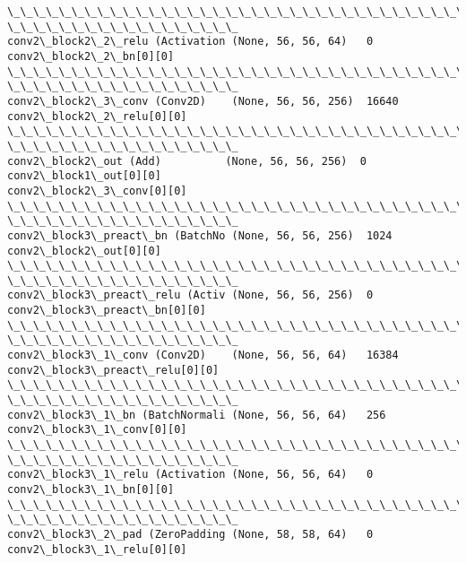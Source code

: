 \documentclass[11pt]{article}
\begin{document}
\begin{Verbatim}[commandchars=\\\{\}]
\_\_\_\_\_\_\_\_\_\_\_\_\_\_\_\_\_\_\_\_\_\_\_\_\_\_\_\_\_\_\_\_\_\_\_\_\_\_\_\_\_\_\_\_\_\_\_\_\_\_\_\_\_\_\_\_\_\_\_\_\_\_\_\_\_\_\_\_\_\_\_\_\_\_\_\_\_\_\_\_
\_\_\_\_\_\_\_\_\_\_\_\_\_\_\_\_\_\_
conv2\_block2\_2\_relu (Activation (None, 56, 56, 64)   0
conv2\_block2\_2\_bn[0][0]
\_\_\_\_\_\_\_\_\_\_\_\_\_\_\_\_\_\_\_\_\_\_\_\_\_\_\_\_\_\_\_\_\_\_\_\_\_\_\_\_\_\_\_\_\_\_\_\_\_\_\_\_\_\_\_\_\_\_\_\_\_\_\_\_\_\_\_\_\_\_\_\_\_\_\_\_\_\_\_\_
\_\_\_\_\_\_\_\_\_\_\_\_\_\_\_\_\_\_
conv2\_block2\_3\_conv (Conv2D)    (None, 56, 56, 256)  16640
conv2\_block2\_2\_relu[0][0]
\_\_\_\_\_\_\_\_\_\_\_\_\_\_\_\_\_\_\_\_\_\_\_\_\_\_\_\_\_\_\_\_\_\_\_\_\_\_\_\_\_\_\_\_\_\_\_\_\_\_\_\_\_\_\_\_\_\_\_\_\_\_\_\_\_\_\_\_\_\_\_\_\_\_\_\_\_\_\_\_
\_\_\_\_\_\_\_\_\_\_\_\_\_\_\_\_\_\_
conv2\_block2\_out (Add)          (None, 56, 56, 256)  0
conv2\_block1\_out[0][0]
conv2\_block2\_3\_conv[0][0]
\_\_\_\_\_\_\_\_\_\_\_\_\_\_\_\_\_\_\_\_\_\_\_\_\_\_\_\_\_\_\_\_\_\_\_\_\_\_\_\_\_\_\_\_\_\_\_\_\_\_\_\_\_\_\_\_\_\_\_\_\_\_\_\_\_\_\_\_\_\_\_\_\_\_\_\_\_\_\_\_
\_\_\_\_\_\_\_\_\_\_\_\_\_\_\_\_\_\_
conv2\_block3\_preact\_bn (BatchNo (None, 56, 56, 256)  1024
conv2\_block2\_out[0][0]
\_\_\_\_\_\_\_\_\_\_\_\_\_\_\_\_\_\_\_\_\_\_\_\_\_\_\_\_\_\_\_\_\_\_\_\_\_\_\_\_\_\_\_\_\_\_\_\_\_\_\_\_\_\_\_\_\_\_\_\_\_\_\_\_\_\_\_\_\_\_\_\_\_\_\_\_\_\_\_\_
\_\_\_\_\_\_\_\_\_\_\_\_\_\_\_\_\_\_
conv2\_block3\_preact\_relu (Activ (None, 56, 56, 256)  0
conv2\_block3\_preact\_bn[0][0]
\_\_\_\_\_\_\_\_\_\_\_\_\_\_\_\_\_\_\_\_\_\_\_\_\_\_\_\_\_\_\_\_\_\_\_\_\_\_\_\_\_\_\_\_\_\_\_\_\_\_\_\_\_\_\_\_\_\_\_\_\_\_\_\_\_\_\_\_\_\_\_\_\_\_\_\_\_\_\_\_
\_\_\_\_\_\_\_\_\_\_\_\_\_\_\_\_\_\_
conv2\_block3\_1\_conv (Conv2D)    (None, 56, 56, 64)   16384
conv2\_block3\_preact\_relu[0][0]
\_\_\_\_\_\_\_\_\_\_\_\_\_\_\_\_\_\_\_\_\_\_\_\_\_\_\_\_\_\_\_\_\_\_\_\_\_\_\_\_\_\_\_\_\_\_\_\_\_\_\_\_\_\_\_\_\_\_\_\_\_\_\_\_\_\_\_\_\_\_\_\_\_\_\_\_\_\_\_\_
\_\_\_\_\_\_\_\_\_\_\_\_\_\_\_\_\_\_
conv2\_block3\_1\_bn (BatchNormali (None, 56, 56, 64)   256
conv2\_block3\_1\_conv[0][0]
\_\_\_\_\_\_\_\_\_\_\_\_\_\_\_\_\_\_\_\_\_\_\_\_\_\_\_\_\_\_\_\_\_\_\_\_\_\_\_\_\_\_\_\_\_\_\_\_\_\_\_\_\_\_\_\_\_\_\_\_\_\_\_\_\_\_\_\_\_\_\_\_\_\_\_\_\_\_\_\_
\_\_\_\_\_\_\_\_\_\_\_\_\_\_\_\_\_\_
conv2\_block3\_1\_relu (Activation (None, 56, 56, 64)   0
conv2\_block3\_1\_bn[0][0]
\_\_\_\_\_\_\_\_\_\_\_\_\_\_\_\_\_\_\_\_\_\_\_\_\_\_\_\_\_\_\_\_\_\_\_\_\_\_\_\_\_\_\_\_\_\_\_\_\_\_\_\_\_\_\_\_\_\_\_\_\_\_\_\_\_\_\_\_\_\_\_\_\_\_\_\_\_\_\_\_
\_\_\_\_\_\_\_\_\_\_\_\_\_\_\_\_\_\_
conv2\_block3\_2\_pad (ZeroPadding (None, 58, 58, 64)   0
conv2\_block3\_1\_relu[0][0]

\end{Verbatim}
\end{document}
